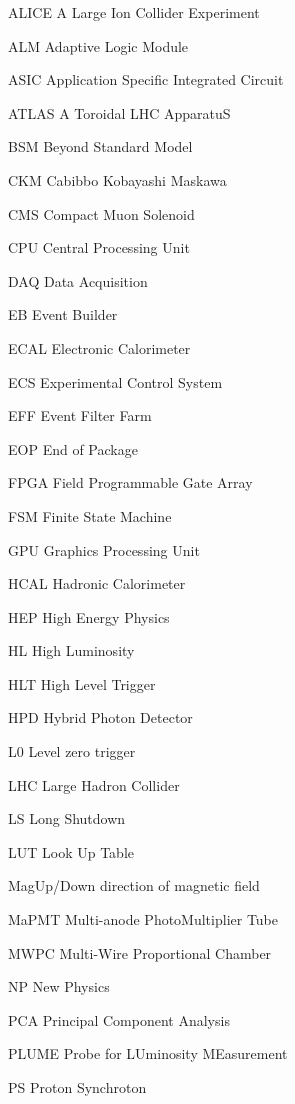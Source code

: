 \begin{abbreviations}
    \item[ALICE] A Large Ion Collider Experiment
    \item[ALM] Adaptive Logic Module
    \item[ASIC] Application Specific Integrated Circuit
    \item[ATLAS] A Toroidal LHC ApparatuS
    \item[BSM] Beyond Standard Model
    \item[CKM] Cabibbo Kobayashi Maskawa
    \item[CMS] Compact Muon Solenoid
    \item[CPU] Central Processing Unit
    \item[DAQ] Data Acquisition
    \item[EB] Event Builder
    \item[ECAL] Electronic Calorimeter
    \item[ECS] Experimental Control System
    \item[EFF] Event Filter Farm
    \item[EOP] End of Package
    \item[FPGA] Field Programmable Gate Array
    \item[FSM] Finite State Machine
    \item[GPU] Graphics Processing Unit
    \item[HCAL] Hadronic Calorimeter
    \item[HEP] High Energy Physics
    \item[HL] High Luminosity
    \item[HLT] High Level Trigger
    \item[HPD] Hybrid Photon Detector
    \item[L0] Level zero trigger
    \item[LHC] Large Hadron Collider
    \item[LS] Long Shutdown
    \item[LUT] Look Up Table
    \item[MagUp/Down] direction of magnetic field
    \item[MaPMT] Multi-anode PhotoMultiplier Tube
    \item[MWPC] Multi-Wire Proportional Chamber
    \item[NP] New Physics
    \item[PCA] Principal Component Analysis
    \item[PLUME] Probe for LUminosity MEasurement
    \item[PS] Proton Synchroton

\end{abbreviations}
